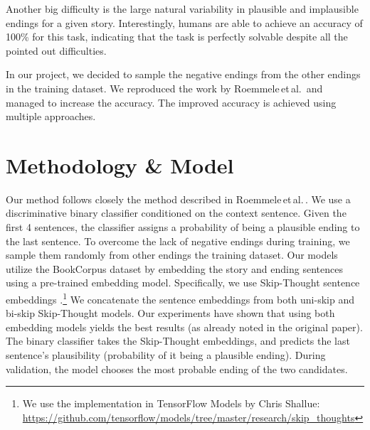 \documentclass{article}
\begin{document}
Another big difficulty is the large natural variability in plausible and implausible endings for a given story. Interestingly, humans are able to achieve an accuracy of 100\% for this task, indicating that the task is perfectly solvable despite all the pointed out difficulties.

In our project, we decided to sample the negative endings from the other endings in the training dataset. We reproduced the work by Roemmele\,et\,al.\,\citep{Roemmele2017AnTest} and managed to increase the accuracy. The improved accuracy is achieved using multiple approaches.



\section{Methodology \& Model}\label{sec:methodology}
Our method follows closely the method described in Roemmele\,et\,al.\,\citep{Roemmele2017AnTest}. We use a discriminative binary classifier conditioned on the context sentence. Given the first 4 sentences, the classifier assigns a probability of being a plausible ending to the last sentence. To overcome the lack of negative endings during training, we sample them randomly from other endings the training dataset. Our models utilize the BookCorpus \citep{Zhu2015AligningBooks} dataset by embedding the story and ending sentences using a pre-trained embedding model. Specifically, we use Skip-Thought sentence embeddings \citep{Kiros2015Skip-ThoughtVectors}.\footnote{We use the implementation in TensorFlow Models by Chris Shallue: \url{https://github.com/tensorflow/models/tree/master/research/skip_thoughts}} We concatenate the sentence embeddings from both uni-skip and bi-skip Skip-Thought models. Our experiments have shown that using both embedding models yields the best results (as already noted in the original paper). The binary classifier takes the Skip-Thought embeddings, and predicts the last sentence's plausibility (probability of it being a plausible ending). During validation, the model chooses the most probable ending of the two candidates.
\end{document}
